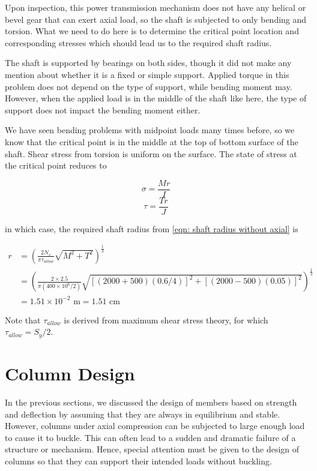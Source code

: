\documentclass[
10pt,
a4paper,
openany,
svgnames,
]{book}
\begin{document}
\begin{solution}
  Upon inspection, this power transmission mechanism does not have any helical or bevel gear that can exert axial load, so the shaft is subjected to only bending and torsion. What we need to do here is to determine the critical point location and corresponding stresses which should lead us to the required shaft radius.

  The shaft is supported by bearings on both sides, though it did not make any mention about whether it is a fixed or simple support. Applied torque in this problem does not depend on the type of support, while bending moment may. However, when the applied load is in the middle of the shaft like here, the type of support does not impact the bending moment either.

  We have seen bending problems with midpoint loads many times before, so we know that the critical point is in the middle at the top of bottom surface of the shaft. Shear stress from torsion is uniform on the surface. The state of stress at the critical point reduces to

  $$ \sigma = \frac{Mr}{I} $$
  $$ \tau = \frac{Tr}{J} $$

  in which case, the required shaft radius from \cref{eqn: shaft radius without axial} is

  \begin{align*}
    r &= \left( \frac{2 N_s}{\pi \tau _{allow}}\sqrt {M^2 +T^2}  \right)^{\frac{1}{3}} \\
      &= \left( \frac{2 \times 2.5}{\pi (400 \times 10^6 /2 )}\sqrt {[(2000+500)(0.6/4)]^2 +[(2000-500)(0.05)]^2}  \right)^{\frac{1}{3}} \\
      &= 1.51 \times 10^{-2} \text{ m} = 1.51 \text{ cm}
  \end{align*}

  Note that $\tau_{allow}$ is derived from maximum shear stress theory, for which $\tau_{allow} = S_y/2$.
\end{solution}

\section{Column Design}

In the previous sections, we discussed the design of members based on strength and deflection by assuming that they are always in equilibrium and stable. However, columns under axial compression can be subjected to large enough load to cause it to buckle. This can often lead to a sudden and dramatic failure of a structure or mechanism. Hence, special attention must be given to the design of columns so that they can support their intended loads without buckling.
\end{document}
